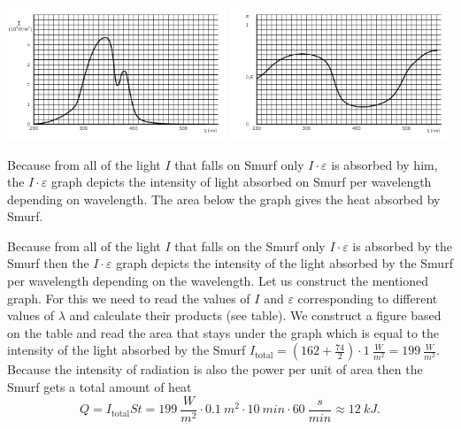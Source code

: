 {\begin{center}
\includegraphics[width=0.49\textwidth]{2011-lahg-04-I}
\includegraphics[width=0.49\textwidth]{2011-lahg-04-epsilon}
\end{center}
\fi


\ifEngHint
Because from all of the light $I$ that falls on Smurf only $ I \cdot\varepsilon $ is absorbed by him, the $ I \cdot \varepsilon $ graph depicts the intensity of light absorbed on Smurf per wavelength depending on wavelength. The area below the graph gives the heat absorbed by Smurf.
\fi


\ifEngSolution
Because from all of the light $I$ that falls on the Smurf only $ I \cdot \varepsilon $ is absorbed by the Smurf then the $ I \cdot \varepsilon $ graph depicts the intensity of the light absorbed by the Smurf per wavelength depending on the wavelength. Let us construct the mentioned graph. For this we need to read the values of $I$ and $ \varepsilon $ corresponding to different values of $ \lambda $ and calculate their products (see table). We construct a figure based on the table and read the area that stays under the graph which is equal to the intensity of the light absorbed by the Smurf $I_{\mathrm{total}} =
(162+\frac{74}{2}) \cdot \SI{1}{\frac{W}{m^2}} = \SI{199}{\frac{W}{m^2}}$. Because the intensity of radiation is also the power per unit of area then the Smurf gets a total amount of heat
\[ Q = I_{\mathrm{total}}St =
\SI{199}{\frac{W}{m^2}} \cdot \SI{0,1}{m^2} \cdot \SI{10}{min} \cdot
\SI{60}{\frac{s}{min}} \approx \SI{12}{kJ}.\]


}
